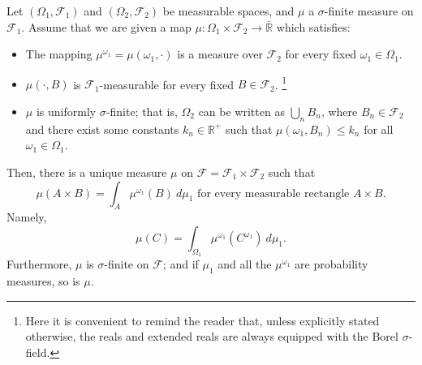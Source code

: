 \begin{thrm}\label{theorem:two-dim Product Measure}
  Let \(\left(\Omega_{1},\mathcal{F}_{1}\right)\) and \linebreak \(\left(\Omega_2,\mathcal{F}_2\right)\) be measurable spaces, and \(\mu\) a \(\sigma\)-finite measure on \(\mathcal{F}_{1}\). Assume that we are given a map
  \(\mu\colon\Omega_{1}\times\mathcal{F}_{2}\to \overline{\mathbb{R}}\) which satisfies:
  \begin{itemize}
	\item The mapping \(\mu^{\omega_1}=\mu(\omega_{1},\cdot)\) is a measure over \(\mathcal{F}_{2}\) for every fixed \(\omega_{1}\in\Omega_{1}\).
	\item \(\mu(\cdot,B)\) is \(\mathcal{F}_{1}\)-measurable for every fixed \(B\in\mathcal{F}_{2}\). \footnote{Here it is convenient to remind the reader that, unless explicitly stated otherwise, the reals and extended reals are always equipped with the Borel \(\sigma\)-field.}
	\item \(\mu\) is uniformly \(\sigma\)-finite; that is, \(\Omega_{2}\) can be written as \(\bigcup_{n}B_{n}\), where \(B_n\in\mathcal{F}_2\) and there exist some constants \(k_{n}\in\mathbb{R}^{+}\) such that \(\mu(\omega_{1},B_{n})\leq k_{n}\) for all \(\omega_{1}\in\Omega_{1}\). %
  \end{itemize}

  Then, there is a unique measure \(\mu\) on \(\mathcal{F}=\mathcal{F}_{1}\times\mathcal{F}_{2}\) such that
  \[\mu(A\times B)=\int_A \mu^{\omega_1}(B)~d\mu_1 \text{ for every measurable rectangle } A\times B.\]
  Namely,
  \[\mu(C)=\int_{\Omega_1}\mu^{\omega_1}(C^{\omega_1})~d\mu_1.\]
  Furthermore, \(\mu\) is \(\sigma\)-finite on \(\mathcal{F}\); and if \(\mu_1\) and all the \(\mu^{\omega_1}\) are probability measures, so is \(\mu\).
\end{thrm}
